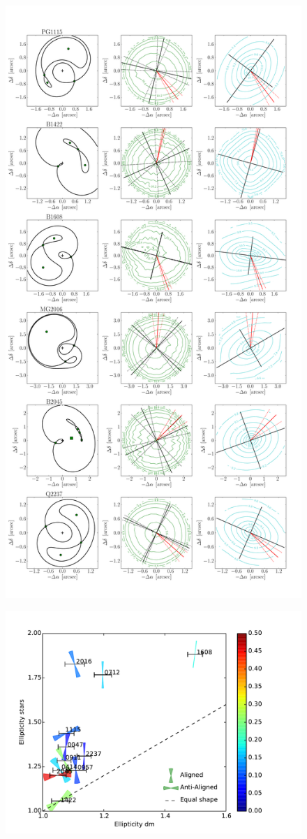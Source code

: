 \documentclass[useAMS,usenatbib]{mn2e}
\begin{document}
\begin{figure}
  \centering
  \includegraphics[width=.65\linewidth]{Figures/AllLenses22.pdf}
  \caption[width=.65\linewidth]{}
  \label{fig:lensreconstruction2}
\end{figure}

\begin{figure}
  \centering
  \includegraphics[width=.65\linewidth]{Figures/wedges_shears.pdf}
  \caption[width=.65\linewidth]{}
  \label{fig:wedges}
\end{figure}
\end{document}
